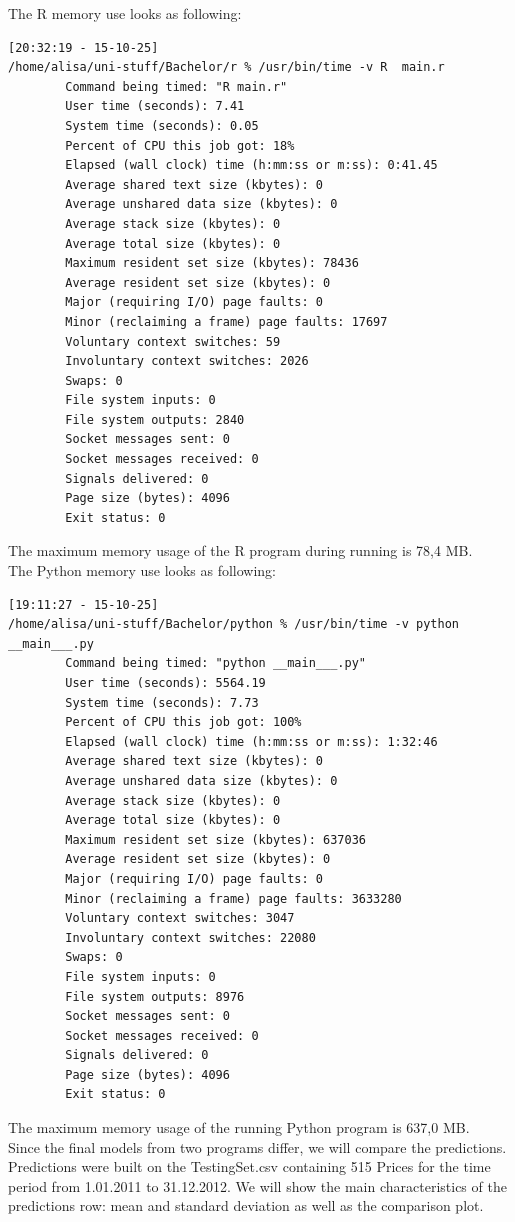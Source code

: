 \documentclass[
  twoside,
  12pt, a4paper,
  footinclude=true,
  headinclude=true,
  cleardoublepage=empty
]{article}
\begin{document}
The R memory use looks as following:
\begin{verbatim}
[20:32:19 - 15-10-25] 
/home/alisa/uni-stuff/Bachelor/r % /usr/bin/time -v R  main.r
        Command being timed: "R main.r"
        User time (seconds): 7.41
        System time (seconds): 0.05
        Percent of CPU this job got: 18%
        Elapsed (wall clock) time (h:mm:ss or m:ss): 0:41.45
        Average shared text size (kbytes): 0
        Average unshared data size (kbytes): 0
        Average stack size (kbytes): 0
        Average total size (kbytes): 0
        Maximum resident set size (kbytes): 78436
        Average resident set size (kbytes): 0
        Major (requiring I/O) page faults: 0
        Minor (reclaiming a frame) page faults: 17697
        Voluntary context switches: 59
        Involuntary context switches: 2026
        Swaps: 0
        File system inputs: 0
        File system outputs: 2840
        Socket messages sent: 0
        Socket messages received: 0
        Signals delivered: 0
        Page size (bytes): 4096
        Exit status: 0
\end{verbatim}
The maximum memory usage of the R program during running is 78,4 MB.\\
The Python memory use looks as following:
\begin{verbatim}
[19:11:27 - 15-10-25] 
/home/alisa/uni-stuff/Bachelor/python % /usr/bin/time -v python __main___.py
        Command being timed: "python __main___.py"
        User time (seconds): 5564.19
        System time (seconds): 7.73
        Percent of CPU this job got: 100%
        Elapsed (wall clock) time (h:mm:ss or m:ss): 1:32:46
        Average shared text size (kbytes): 0
        Average unshared data size (kbytes): 0
        Average stack size (kbytes): 0
        Average total size (kbytes): 0
        Maximum resident set size (kbytes): 637036
        Average resident set size (kbytes): 0
        Major (requiring I/O) page faults: 0
        Minor (reclaiming a frame) page faults: 3633280
        Voluntary context switches: 3047
        Involuntary context switches: 22080
        Swaps: 0
        File system inputs: 0
        File system outputs: 8976
        Socket messages sent: 0
        Socket messages received: 0
        Signals delivered: 0
        Page size (bytes): 4096
        Exit status: 0
\end{verbatim}
The maximum memory usage of the running Python program is 637,0 MB.\\
Since the final models from two programs differ, we will compare the predictions. Predictions were built on the TestingSet.csv containing 515 Prices for the time period from 1.01.2011 to 31.12.2012. We will show the main characteristics of the predictions row: mean and standard deviation as well as the comparison plot.\\
\end{document}
